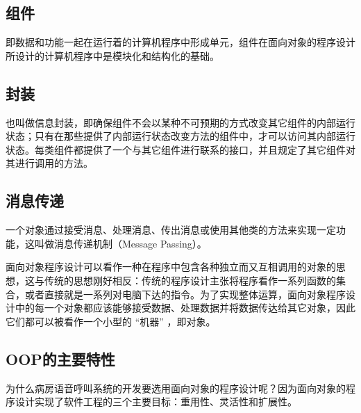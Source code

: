 \subsection{组件}
即{\cf}数据{\cf}和功{\cf}能一{\cf}起在{\cf}运行{\cf}着的{\cf}计算{\cf}机程{\cf}序中{\cf}形成{\cf}单元{\cf}，组{\cf}件在{\cf}面向{\cf}对象{\cf}的程{\cf}序设{\cf}计所{\cf}设计{\cf}的计{\cf}算机{\cf}程序{\cf}中是{\cf}模块{\cf}化和{\cf}结构{\cf}化的{\cf}基础。

\subsection{封装}
也{\cf}叫做{\cf}信息{\cf}封装{\cf}，即{\cf}确保{\cf}组件{\cf}不会{\cf}以某{\cf}种不{\cf}可预{\cf}期的{\cf}方式{\cf}改变{\cf}其它{\cf}组件{\cf}的内{\cf}部运{\cf}行状{\cf}态；{\cf}只有{\cf}在那{\cf}些提{\cf}供了{\cf}内部{\cf}运行{\cf}状态{\cf}改变{\cf}方法{\cf}的组{\cf}件中{\cf}，才{\cf}可以{\cf}访问{\cf}其内{\cf}部运{\cf}行状{\cf}态。{\cf}每类{\cf}组件{\cf}都提{\cf}供了{\cf}一个{\cf}与其{\cf}它组{\cf}件进{\cf}行联{\cf}系的{\cf}接口{\cf}，并{\cf}且规{\cf}定了{\cf}其它{\cf}组件{\cf}对其{\cf}进行{\cf}调用{\cf}的方{\cf}法。

\subsection{消息传递}
一{\cf}个对{\cf}象通{\cf}过接{\cf}受消{\cf}息、{\cf}处理{\cf}消息{\cf}、传{\cf}出消{\cf}息或{\cf}使用{\cf}其他{\cf}类的{\cf}方法{\cf}来实{\cf}现一{\cf}定功{\cf}能，{\cf}这叫{\cf}做消{\cf}息传{\cf}递机制（Message Passing）。

面{\cf}向对{\cf}象程{\cf}序设{\cf}计可{\cf}以看{\cf}作一{\cf}种在{\cf}程序{\cf}中包{\cf}含各{\cf}种独{\cf}立而{\cf}又互{\cf}相调{\cf}用的{\cf}对象{\cf}的思{\cf}想，{\cf}这与{\cf}传统{\cf}的思{\cf}想刚{\cf}好相{\cf}反：{\cf}传统{\cf}的程{\cf}序设{\cf}计主{\cf}张将{\cf}程序{\cf}看作{\cf}一系{\cf}列函{\cf}数的{\cf}集合{\cf}，或{\cf}者直{\cf}接就{\cf}是一{\cf}系列{\cf}对电{\cf}脑下{\cf}达的{\cf}指令{\cf}。为{\cf}了实{\cf}现整{\cf}体运{\cf}算，{\cf}面向{\cf}对象{\cf}程序{\cf}设计{\cf}中的{\cf}每一{\cf}个对{\cf}象都{\cf}应该{\cf}能够{\cf}接受{\cf}数据{\cf}、处{\cf}理数{\cf}据并{\cf}将数{\cf}据传{\cf}达给{\cf}其它{\cf}对象{\cf}，因{\cf}此它{\cf}们都{\cf}可以{\cf}被看{\cf}作一{\cf}个小{\cf}型的{\cf} “机{\cf}器” {\cf}，即{\cf}对象{\cf}。

\subsection{\acrshort{OOP}的主要特性}
为什么病房语音呼叫系统的开发要选用面向对象的程序设计呢？因为面向对象的程序设计实现了软件工程的三个主要目标：重用性、灵活性和扩展性。
 
